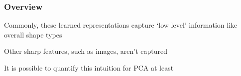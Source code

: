 \documentclass[12pt]{beamer}
\begin{document}
\begin{frame}[fragile]
\frametitle{Overview}
Commonly, these learned representations capture `low level' information like overall shape types

\vsp
Other sharp features, such as images, aren't captured

\vsp
It is possible to quantify this intuition for PCA at least

\end{frame}
%
%
%
%
%
%
%
%
%
%
%
%
\end{document}

